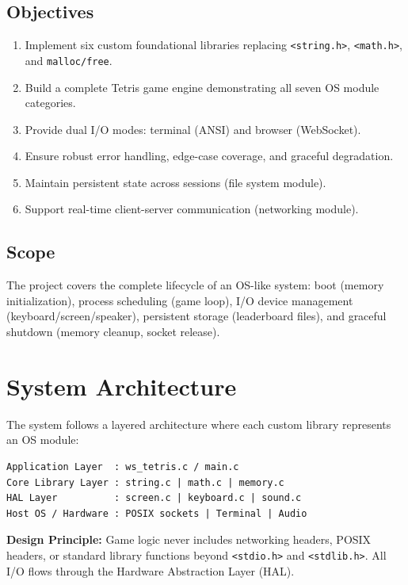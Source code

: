 \documentclass[conference]{IEEEtran}
\begin{document}
\subsection{Objectives}
\begin{enumerate}
  \item Implement six custom foundational libraries replacing \texttt{<string.h>}, \texttt{<math.h>}, and \texttt{malloc/free}.
  \item Build a complete Tetris game engine demonstrating all seven OS module categories.
  \item Provide dual I/O modes: terminal (ANSI) and browser (WebSocket).
  \item Ensure robust error handling, edge-case coverage, and graceful degradation.
  \item Maintain persistent state across sessions (file system module).
  \item Support real-time client-server communication (networking module).
\end{enumerate}

\subsection{Scope}
The project covers the complete lifecycle of an OS-like system: boot (memory initialization), process scheduling (game loop), I/O device management (keyboard/screen/speaker), persistent storage (leaderboard files), and graceful shutdown (memory cleanup, socket release).

\section{System Architecture}

The system follows a layered architecture where each custom library represents an OS module:

\begin{lstlisting}[caption={System Architecture Layers}]
Application Layer  : ws_tetris.c / main.c
Core Library Layer : string.c | math.c | memory.c
HAL Layer          : screen.c | keyboard.c | sound.c
Host OS / Hardware : POSIX sockets | Terminal | Audio
\end{lstlisting}

\textbf{Design Principle:} Game logic never includes networking headers, POSIX headers, or standard library functions beyond \texttt{<stdio.h>} and \texttt{<stdlib.h>}. All I/O flows through the Hardware Abstraction Layer (HAL).
\end{document}
